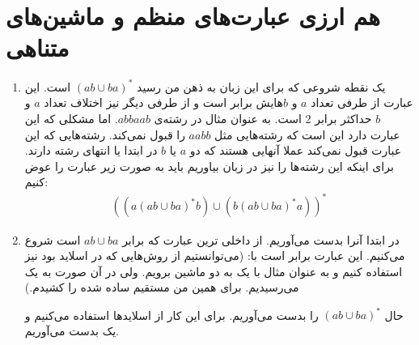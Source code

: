 \section{هم ارزی عبارت‌های منظم و ماشین‌های متناهی}
\begin{enumerate}
    \item یک نقطه شروعی که برای این زبان به ذهن من رسید
    $(ab \cup ba)^*$
    است. این عبارت از طرفی تعداد
    $a$ و $b$هایش
    برابر است و از طرفی دیگر نیز اختلاف تعداد
    $a$ و $b$
    حداکثر برابر 2 است. به عنوان مثال در رشته‌ی
    $abbaab$.
    اما مشکلی که این عبارت دارد این است که رشته‌هایی مثل
    $aabb$
    را قبول نمی‌کند.
    رشته‌هایی که این عبارت قبول نمی‌کند عملا آنهایی هستند که دو
    $a$ یا $b$
    در ابتدا یا انتهای رشته دارند. برای اینکه این رشته‌ها را نیز در زبان بیاوریم باید به صورت زیر عبارت را
    عوض کنیم:
    \begin{gather*}
        \left( \left(a(ab \cup ba)^*b\right) \cup \left(b(ab \cup ba)^*a\right) \right)^*
    \end{gather*}
    \item در ابتدا
    آنرا بدست می‌آوریم. از داخلی ترین عبارت که برابر
    $ab \cup ba$
    است شروع می‌کنیم.  این عبارت برابر است با:
    (می‌توانستیم از روش‌هایی که در اسلاید بود نیز استفاده کنیم و به عنوان مثال با یک
    به دو ماشین برویم. ولی در آن صورت به یک
    می‌رسیدیم. برای همین من مستقیم
    ساده شده را کشیدم.)
    \begin{latin}
        \centering
    \end{latin}
    حال
    $(ab \cup ba)^*$
    را بدست می‌آوریم. برای این کار از اسلاید‌ها استفاده می‌کنیم و یک
    بدست می‌آوریم.
    \begin{latin}
        \centering
        \begin{tikzpicture}[->, >=stealth', auto, semithick, node distance=2cm]

\end{tikzpicture}
\end{latin}
\end{enumerate}
